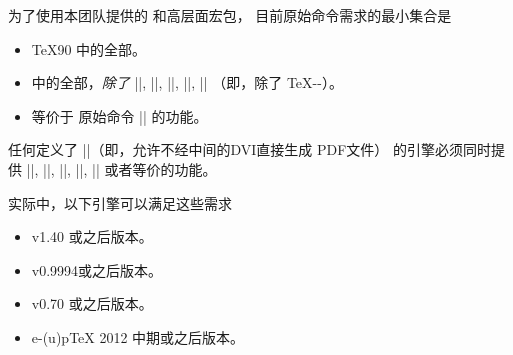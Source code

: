 \documentclass{l3doc}
\begin{document}
%
为了使用本团队提供的  和高层面宏包，
目前原始命令需求的最小集合是
\begin{itemize}
    \item \TeX90 中的全部。
    \item \eTeX{} 中的全部，\emph{除了} |\TeXXeTstate|, |\beginL|, |\beginR|, |\endL|, |\endR| 
    （即，除了 \TeX{}-\kern0pt-）。
    \item 等价于 \pdfTeX{} 原始命令 |\pdfstrcmp| 的功能。
\end{itemize}
任何定义了 |\pdfoutput|（即，允许不经中间的DVI直接生成 PDF文件）
的引擎必须同时提供 |\pdfcolorstack|, |\pdfliteral|, |\pdfmatrix|, |\pdfrestore|, |\pdfsave| 或者等价的功能。

%
实际中，以下引擎可以满足这些需求
\begin{itemize}
    \item \pdfTeX{} v1.40 或之后版本。
    \item \XeTeX{} v0.9994或之后版本。
    \item \LuaTeX{} v0.70 或之后版本。
    \item e-(u)p\TeX{} 2012 中期或之后版本。
\end{itemize}
\end{document}
